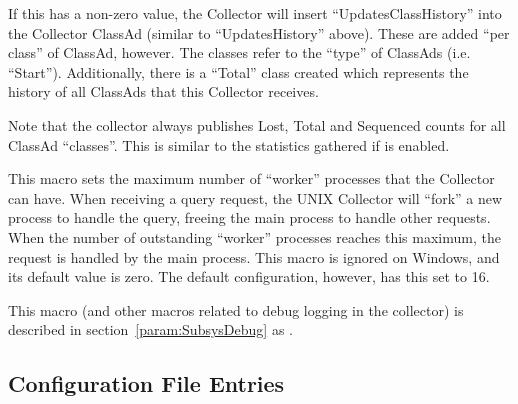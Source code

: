 \begin{description}
  If this has a non-zero value, the Collector will insert
  ``UpdatesClassHistory'' into the Collector ClassAd (similar to
  ``UpdatesHistory'' above).  These are added ``per class'' of
  ClassAd, however.  The classes refer to the ``type'' of ClassAds
  (i.e. ``Start'').  Additionally, there is a ``Total'' class created
  which represents the history of all ClassAds that this Collector
  receives.

  Note that the collector always publishes Lost, Total and Sequenced
  counts for all ClassAd ``classes''.  This is similar to the
  statistics gathered if  is enabled.

\label{param:CollectorQueryWorkers}
\item[\Macro{COLLECTOR\_QUERY\_WORKERS}]
  This macro sets the maximum
  number of ``worker'' processes that the Collector can have.  When
  receiving a query request, the UNIX Collector will ``fork'' a new
  process to handle the query, freeing the main process to handle
  other requests.  When the number of outstanding ``worker'' processes
  reaches this maximum, the request is handled by the main process.
  This macro is ignored on Windows, and its default value is zero.
  The default configuration, however, has this set to 16.

\label{param:CollectorDebug}
\item[\Macro{COLLECTOR\_DEBUG}]
  This macro (and other macros related to debug logging in the collector)
  is described in section~\ref{param:SubsysDebug} as
  .

\end{description}

\subsection{\label{sec:Negotiator-Config-File-Entries}
Configuration File Entries}

